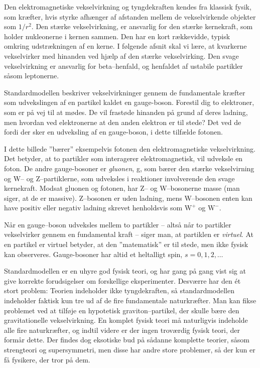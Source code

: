 Den elektromagnetiske vekselvirkning og tyngdekraften kendes fra
klassisk fysik, som kræfter, hvis styrke afhænger af afstanden mellem
de vekselvirkende objekter som $1/r^2$. Den stærke vekselvirkning, er
ansvarlig for den stærke kernekraft, som holder nukleonerne i kernen
sammen. Den har en kort rækkevidde, typisk omkring udstrækningen af en
kerne. I følgende afsnit skal vi lære, at kvarkerne vekselvirker med
hinanden ved hjælp af den stærke vekselvirking. Den svage
vekselvirkning er ansvarlig for beta--henfald, og henfaldet af ustabile
partikler såsom leptonerne.

Standardmodellen beskriver vekselvirkninger gennem de fundamentale
kræfter som udvekslingen af en partikel kaldet en
gauge-boson. Forestil dig to elektroner, som er på vej til at
mødes. De vil frastøde hinanden på grund af deres ladning, men hvordan
ved elektronerne at den anden elektron er til stede? Det ved de fordi
der sker en udveksling af en gauge-boson, i dette tilfælde fotonen.

I dette billede ''bærer'' eksempelvis fotonen den elektromagnetiske
vekselvirkning. Det betyder, at to partikler som interagerer
elektromagnetisk, vil udveksle en foton. De andre gauge-bosoner er
\emph{gluonen}, g, som bærer den stærke vekselvirning og W-- og
Z--partiklerne, som udveksles i reaktioner involverende den svage
kernekraft. Modsat gluonen og fotonen, har Z-- og W--bosonerne masse
(man siger, at de er massive). Z--bosonen er uden ladning, mens
W--bosonen enten kan have positiv eller negativ ladning skrevet
henholdsvis som $\text{W}^+$ og $\text{W}^-$.

Når en gauge--boson udveksles mellem to partikler -- altså når to
partikler vekselvirker gennem en fundamental kraft -- siger man, at
partiklen er \emph{virtuel}. At en partikel er virtuel betyder, at den
''matematisk'' er til stede, men ikke fysisk kan observeres.  Gauge-bosoner har altid et heltalligt
spin, $s = 0,1,2,\dots$

Standardmodellen er en uhyre god fysisk teori, og har gang på gang
vist sig at give korrekte forudsigelser om forskellige
eksperimenter. Desværre har den ét stort problem: Teorien indeholder
ikke tyngdekraften, så standardmodellen indeholder faktisk kun tre ud
af de fire fundamentale naturkræfter. Man kan fikse problemet ved at
tilføje en hypotetisk graviton--partikel, der skulle bære den
gravitationelle vekselvirkning. En komplet fysisk teori må
naturligvis indeholde alle fire naturkræfter, og indtil videre er der
ingen troværdig fysisk teori, der formår dette. Der findes dog
eksotiske bud på sådanne komplette teorier, såsom strengteori og
supersymmetri, men disse har andre store problemer, så der kun er få
fysikere, der tror på dem.

